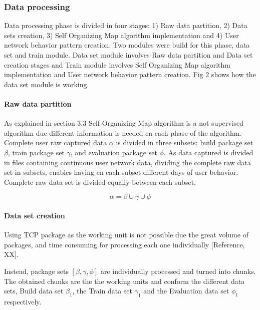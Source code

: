 \documentclass{article}
\begin{document}
\subsubsection{Data processing} %
Data processing phase is divided in four stages: 1) Raw data partition, 2) Data sets creation, 3) Self Organizing Map algorithm implementation and 4) User network behavior pattern creation. Two modules were build for this phase, data set and train module. Data set module involves Raw data partition and Data set creation stages and Train module involves Self Organizing Map algorithm implementation and User network behavior pattern creation. Fig 2 shows how the data set module is working.




\paragraph{Raw data partition} %
As explained in section 3.3 Self Organizing Map algorithm is a not supervised algorithm due different information is needed en each phase of the algorithm. Complete user raw captured data $\alpha$ is divided in three subsets: build package set $\beta$, train package set $\gamma$, and evaluation package set $\phi$. As data captured is divided in files containing continuous user network data, dividing the complete raw data set in subsets, enables having en each subset different days of user behavior. Complete raw data set is divided equally between each subset.

\begin{equation}
\alpha = \beta \cup \gamma \cup \phi
\end{equation}




\paragraph{Data set creation} %
Using TCP package as the working unit is not possible due the great volume of packages, and time consuming for processing each one individually [Reference, XX].

Instead, package sets $[\beta,\gamma,\phi]$ are individually processed and turned into chunks. The obtained chunks are the the working units and conform the different data sets, Build data set $\beta_1$, the Train data set $\gamma_1$ and the Evaluation data set $\phi_1$ respectively.
\end{document}

